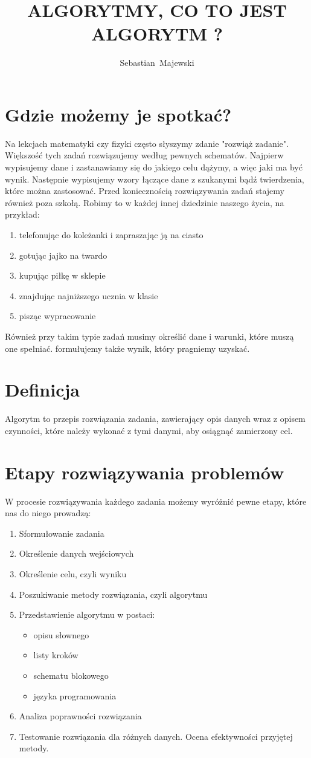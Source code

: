 \documentclass[a4paper,11pt]{article}
\author{Sebastian~Majewski}
\title{ALGORYTMY, CO TO JEST ALGORYTM ?}
\begin{document}
\maketitle
\newpage
\tableofcontents
\section{Gdzie możemy je spotkać?}
Na lekcjach matematyki czy fizyki często słyszymy zdanie "rozwiąż zadanie". 
Większość tych zadań rozwiązujemy według pewnych schematów. Najpierw 
wypisujemy dane i zastanawiamy się do jakiego celu dążymy, a więc jaki ma być 
wynik. Następnie wypisujemy wzory łączące dane z szukanymi bądź twierdzenia, 
które można zastosować. 
Przed koniecznością rozwiązywania zadań stajemy również poza szkołą. Robimy to 
w każdej innej dziedzinie naszego życia, na przykład:
\begin{enumerate}
\item telefonując do koleżanki i zapraszając ją na ciasto 
\item gotując jajko na twardo 
\item kupując piłkę w sklepie 
\item znajdując najniższego ucznia w klasie 
\item pisząc wypracowanie
\end{enumerate} 
Również przy takim typie zadań musimy określić dane i warunki, które muszą one 
spełniać. formułujemy także wynik, który pragniemy uzyskać. 
\section{Definicja}
Algorytm to przepis rozwiązania zadania, zawierający opis 
danych wraz z opisem czynności, które należy wykonać z tymi 
danymi, aby osiągnąć zamierzony cel.
\section{Etapy rozwiązywania problemów} 
W procesie rozwiązywania każdego zadania możemy wyróżnić pewne etapy, które 
nas do niego prowadzą:
\begin{enumerate} 
\item Sformułowanie zadania 
\item Określenie danych wejściowych 
\item Określenie celu, czyli wyniku 
\item Poszukiwanie metody rozwiązania, czyli algorytmu 
\item Przedstawienie algorytmu w postaci:
\begin{itemize}
\item opisu słownego 
\item listy kroków 
\item schematu blokowego 
\item języka programowania
\end{itemize} 
\item Analiza poprawności rozwiązania 
\item Testowanie rozwiązania dla różnych danych. Ocena efektywności przyjętej 
metody.
\end{enumerate} 
\newpage
\end{document}
